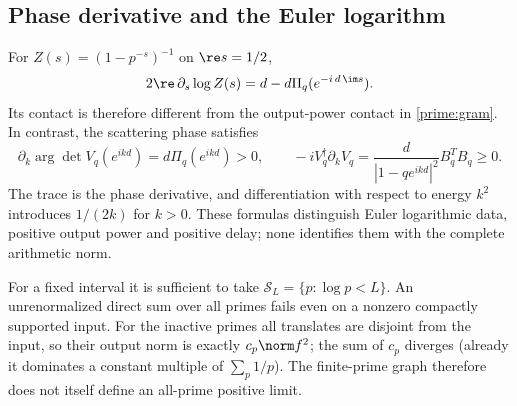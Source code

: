 \subsection{Phase derivative and the Euler logarithm}
For $Z(s)=(1-p^{-s})^{-1}$ on $\re s=1/2$,
\[
2\re\,\partial_s\log Z(s)=d-d\Pi_q(e^{-i\,d\,\im s}).
\]
Its contact is therefore different from the output-power contact
in \eqref{prime:gram}. In contrast, the scattering phase satisfies
\[
\partial_k\arg\det V_q(e^{ikd})=d\Pi_q(e^{ikd})>0,\qquad
-iV_q^\dagger\partial_kV_q
 =\frac{d}{|1-qe^{ikd}|^2}B_q^TB_q\ge0.
\]
The trace is the phase derivative, and differentiation with
respect to energy $k^2$ introduces $1/(2k)$ for $k>0$.
These formulas distinguish Euler logarithmic data, positive
output power and positive delay; none identifies them with the
complete arithmetic norm.

For a fixed interval it is sufficient to take
$\mathcal S_L=\{p:\log p<L\}$. An unrenormalized direct sum over
all primes fails even on a nonzero compactly supported input.
For the inactive primes all translates are disjoint from the
input, so their output norm is exactly $c_p\norm f^2$; the sum
of $c_p$ diverges (already it dominates a constant multiple of
$\sum_p1/p$). The finite-prime graph therefore does not itself
define an all-prime positive limit.
